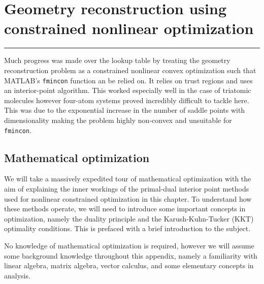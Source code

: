 \chapter{Geometry reconstruction using constrained nonlinear optimization}\label{ch:optimization}

\vspace{-1.5 em}
\begin{addmargin}[-0.5cm]{0cm}
  \minitoc
\end{addmargin}
\hrule
\vspace{1.5 em}

Much progress was made over the lookup table by treating the geometry reconstruction problem as a constrained nonlinear convex optimization such that MATLAB's \texttt{fmincon} function an be relied on. It relies on trust regions and uses an interior-point algorithm. This worked especially well in the case of triatomic molecules however four-atom systems proved incredibly difficult to tackle here. This was due to the exponential increase in the number of saddle points with dimensionality \footnotemark making the problem highly non-convex and unsuitable for \texttt{fmincon}.


\section{Mathematical optimization}

We will take a massively expedited tour of mathematical optimization with the aim of explaining the inner workings of the primal-dual interior point methods used for nonlinear constrained optimization in this chapter. To understand how these methods operate, we will need to introduce some important concepts in optimization, namely the duality principle and the Karush-Kuhn-Tucker (KKT) optimality conditions. This is prefaced with a brief introduction to the subject.

No knowledge of mathematical optimization is required, however we will assume some background knowledge throughout this appendix, namely a familiarity with linear algebra, matrix algebra, vector calculus, and some elementary concepts in analysis.


